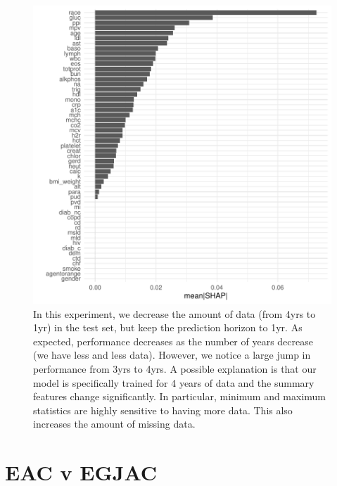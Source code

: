 \documentclass[12pt]{article}
\begin{document}
\begin{figure}[h]
\centering
\includegraphics[width=1.0\textwidth]{figures/roc_window_x-1.pdf}
\caption{In this experiment, we decrease the amount of data (from 4yrs to 1yr) in the test set, 
but keep the prediction horizon to 1yr. As expected, performance decreases as the number of years
decrease (we have less and less data). However, we notice a large jump in performance from
3yrs to 4yrs. A possible explanation is that our model is specifically trained for 4 years of data
and the summary features change significantly. In particular, minimum and maximum statistics are 
highly sensitive to having more data. This also increases the amount of missing data.}
\end{figure}



\clearpage
\section*{EAC v EGJAC}
\end{document}
